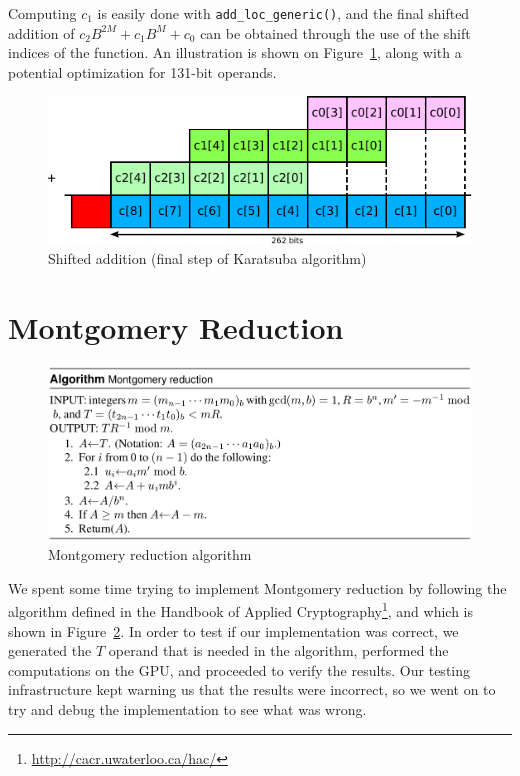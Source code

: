 \documentclass[12pt, a4paper]{report}
\begin{document}
Computing $c_1$ is easily done with \verb+add_loc_generic()+, and the final
shifted addition of $c_2 B^{2M} + c_1 B^{M} + c_0$ can be obtained through
the use of the shift indices of the function.
An illustration is shown on Figure~\ref{fig:shift_addition_karatsuba_final},
along with a potential optimization for 131-bit operands.

\begin{figure}[h]
\centering
\includegraphics[scale=0.8]{figs/shift_addition_karatsuba_final}
\caption{Shifted addition (final step of Karatsuba algorithm)}
\label{fig:shift_addition_karatsuba_final}
\end{figure}

\section{Montgomery Reduction}
\begin{figure}[h]
\centering
\includegraphics[width=\linewidth]{figs/montgomery_reduction}
\caption{Montgomery reduction algorithm}
\label{fig:montgomery_reduction}
\end{figure}

We spent some time trying to implement Montgomery reduction by following the
algorithm defined in the Handbook of Applied Cryptography\footnote{\url{http://cacr.uwaterloo.ca/hac/}}, and which is shown
in Figure~\ref{fig:montgomery_reduction}.
In order to test if our implementation was correct, we generated the $T$ operand
that is needed in the algorithm, performed the computations on the GPU, and proceeded to
verify the results.
Our testing infrastructure kept warning us that the results were incorrect, so we went on to try
and debug the implementation to see what was wrong.
\end{document}
